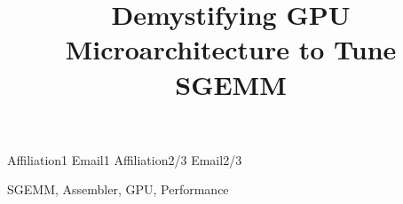 \documentclass[preprint, 10pt, numbers]{sigplanconf}
\begin{document}






\title{Demystifying GPU Microarchitecture to Tune SGEMM}
\subtitle{}


           {Affiliation1}
           {Email1}
           {Affiliation2/3}
           {Email2/3}

\maketitle




\keywords
SGEMM, Assembler, GPU, Performance








%
%




\newpage
\newpage
\pagebreak

\appendix

\end{document}
